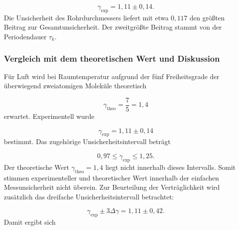 \documentclass{report}
\begin{document}
\begin{equation}
\boxed{
\gamma_\mathrm{exp}=1{,}11\pm0{,}14
}.
\end{equation}
\noindent
Die Unsicherheit des Rohrdurchmessers liefert mit etwa $0{,}117$ den
größten Beitrag zur Gesamtunsicherheit. Der zweitgrößte Beitrag stammt
von der Periodendauer $\tau_k$.


\subsubsection{Vergleich mit dem theoretischen Wert und Diskussion}
\noindent
Für Luft wird bei Raumtemperatur aufgrund der fünf Freiheitsgrade der
überwiegend zweiatomigen Moleküle theoretisch

\begin{equation}
\gamma_\mathrm{theo}
=
\frac{7}{5}
=
1{,}4
\end{equation}
\noindent
erwartet.
\noindent
Experimentell wurde

\begin{equation}
\gamma_\mathrm{exp}
=
1{,}11\pm0{,}14
\end{equation}
\noindent
bestimmt. Das zugehörige Unsicherheitsintervall beträgt

\begin{equation}
0{,}97\leq\gamma_\mathrm{exp}\leq1{,}25.
\end{equation}
\noindent
Der theoretische Wert $\gamma_\mathrm{theo}=1{,}4$ liegt nicht innerhalb
dieses Intervalls. Somit stimmen experimenteller und theoretischer Wert
innerhalb der einfachen Messunsicherheit nicht überein.
\noindent
Zur Beurteilung der Verträglichkeit wird zusätzlich das dreifache
Unsicherheitsintervall betrachtet:

\begin{equation}
\gamma_\mathrm{exp}\pm3\Delta\gamma
=
1{,}11\pm0{,}42.
\end{equation}
\noindent
Damit ergibt sich
\end{document}
